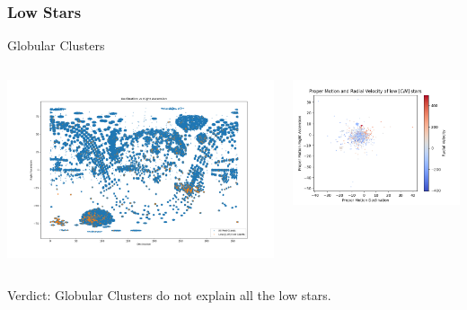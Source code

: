 \subsubsection{Low \CN Stars}
\begin{frame}{Globular Clusters}
    \begin{columns}
      \begin{column}{0.7\textwidth}
            \includegraphics[width=\columnwidth]{Figures/PositionOfLowCNStars.png}
      \end{column}
      \begin{column}{0.4\textwidth}
            \includegraphics[width=\columnwidth]{Figures/LowCNStarsMotion.png}
      \end{column}
    \end{columns}
    \begin{center}
    Verdict: Globular Clusters do not explain all the low \CN stars.
    \end{center}
\end{frame}

